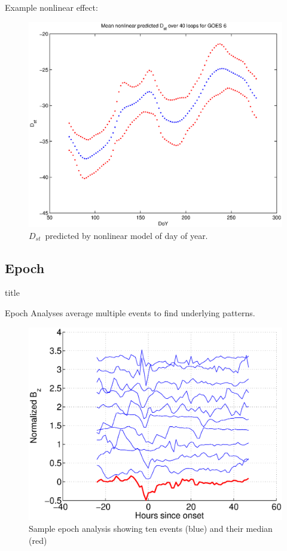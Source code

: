 \documentclass[xcolor={dvipsnames,table}]{beamer}
\newcommand{\subheader}{    		\begin{center}
  	\begin{beamercolorbox}[sep=4pt,center,shadow=true,rounded=true]{title}
  		\usebeamerfont{title}\subsecname\par%
  	\end{beamercolorbox}
  	\vfill
  	\end{center}}
\newcommand{\dst}{\ensuremath{D_{st}}} %
\begin{document}
\begin{frame}
	Example nonlinear effect:
	\begin{figure}[htp!]
		\centering
		\includegraphics[width=0.7\linewidth]{Figures/NNDoY-Dst-GOES6}	
		\caption{\dst\ predicted by nonlinear model of day of year.}
		\label{fig:DoYDst}
	\end{figure}
\end{frame}




\subsection{Epoch}
\begin{frame}
	\subheader
	Epoch Analyses average multiple events to find underlying patterns.
\begin{figure}
\includegraphics[scale=0.3]{Figures/epochexample}
\caption{Sample epoch analysis showing ten events (blue) and their median (red)}
\label{fig:epochexample}
\end{figure}
\end{frame}
\end{document}

